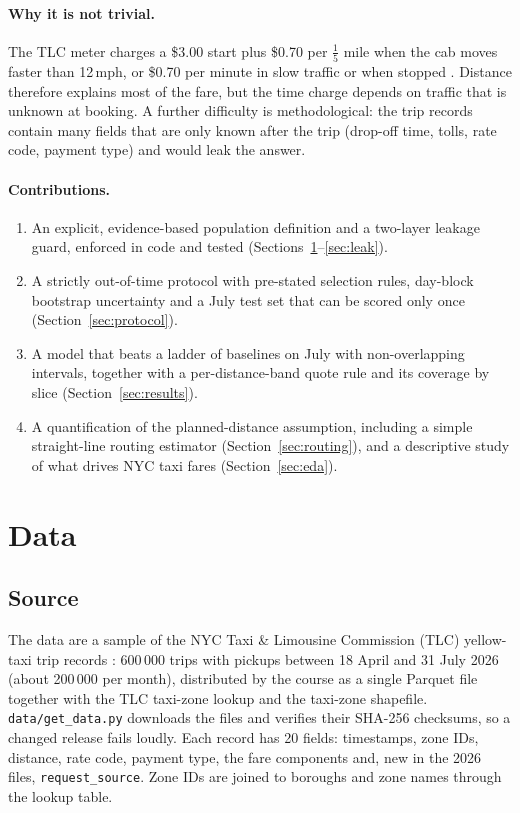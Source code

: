 \documentclass[11pt,a4paper]{article}
\newcommand{\usd}[1]{\$#1}%
\newcommand{\code}[1]{\texttt{#1}}
\begin{document}
\paragraph{Why it is not trivial.} The TLC meter charges a \usd{3.00} start plus \usd{0.70} per \(\tfrac15\) mile when the cab moves faster than 12\,mph, or \usd{0.70} per minute in slow traffic or when stopped \cite{tlcfare}. Distance therefore explains most of the fare, but the time charge depends on traffic that is unknown at booking. A further difficulty is methodological: the trip records contain many fields that are only known after the trip (drop-off time, tolls, rate code, payment type) and would leak the answer.

\paragraph{Contributions.}
\begin{enumerate}
  \item An explicit, evidence-based population definition and a two-layer leakage guard, enforced in code and tested (Sections~\ref{sec:data}--\ref{sec:leak}).
  \item A strictly out-of-time protocol with pre-stated selection rules, day-block bootstrap uncertainty and a July test set that can be scored only once (Section~\ref{sec:protocol}).
  \item A model that beats a ladder of baselines on July with non-overlapping intervals, together with a per-distance-band quote rule and its coverage by slice (Section~\ref{sec:results}).
  \item A quantification of the planned-distance assumption, including a simple straight-line routing estimator (Section~\ref{sec:routing}), and a descriptive study of what drives NYC taxi fares (Section~\ref{sec:eda}).
\end{enumerate}

\section{Data}\label{sec:data}
\subsection{Source}
The data are a sample of the NYC Taxi \& Limousine Commission (TLC) yellow-taxi trip records \cite{tlcdict}: 600\,000 trips with pickups between 18 April and 31 July 2026 (about 200\,000 per month), distributed by the course as a single Parquet file together with the TLC taxi-zone lookup and the taxi-zone shapefile. \code{data/get\_data.py} downloads the files and verifies their SHA-256 checksums, so a changed release fails loudly. Each record has 20 fields: timestamps, zone IDs, distance, rate code, payment type, the fare components and, new in the 2026 files, \code{request\_source}. Zone IDs are joined to boroughs and zone names through the lookup table.
\end{document}
